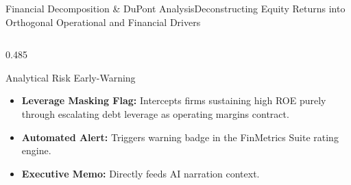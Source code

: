 \begin{frame}{Financial Decomposition \& DuPont Analysis}{Deconstructing Equity Returns into Orthogonal Operational and Financial Drivers}
\begin{columns}[T,onlytextwidth]
\begin{column}{0.485\textwidth}
            \vspace{0.12cm}

            \begin{quantcard}[height=2.74cm]{Analytical Risk Early-Warning}
                \fontsize{5.8pt}{7.0pt}\selectfont
                \begin{itemize}
                    \setlength{\itemsep}{1.5pt}
                    \item \textbf{Leverage Masking Flag:} Intercepts firms sustaining high ROE purely through escalating debt leverage as operating margins contract.
                    \item \textbf{Automated Alert:} Triggers  warning badge in the FinMetrics Suite rating engine.
                    \item \textbf{Executive Memo:} Directly feeds AI narration context.
                \end{itemize}
            \end{quantcard}
        \end{column}
    \end{columns}
\end{frame}
